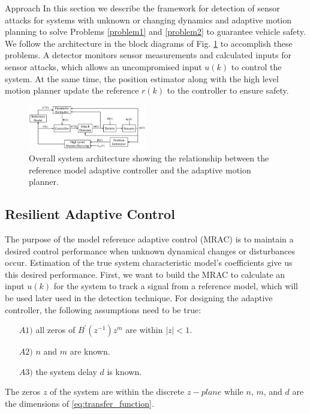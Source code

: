 
\begin{section}{Approach}
\label{sec:approach}
In this section we describe the framework for detection of sensor attacks for systems with unknown or changing dynamics and adaptive motion planning to solve Problems \ref{problem1} and \ref{problem2} to guarantee vehicle safety. We follow the architecture in the block diagrams of Fig. \ref{fig:system_arch} to accomplish these problems. A detector monitors sensor measurements and calculated inputs for sensor attacks, which allows an uncompromised input $u(k)$ to control the system. At the same time, the position estimator along with the high level motion planner update the reference $r(k)$ to the controller to ensure safety.

\begin{figure}[ht!]
\vspace{1pt}
\centering
\includegraphics[width=0.46\textwidth]{sys_arch.png}
\caption{Overall system architecture showing the relationship between the reference model adaptive controller and the adaptive motion planner.}
\label{fig:system_arch}
\end{figure}

\subsection{Resilient Adaptive Control}
\label{sec:Res_adapt_control}
The purpose of the model reference adaptive control (MRAC) is to maintain a desired control performance when unknown dynamical changes or disturbances occur. Estimation of the true system characteristic model's coefficients give us this desired performance. First, we want to build the MRAC to calculate an input $u(k)$ for the system to track a signal from a reference model, which will be used later used in the detection technique. For designing the adaptive controller, the following assumptions need to be true:
	\begin{enumerate}[leftmargin=4\parindent]
	\item[$A1)$] all zeros of $B^{'}(z^{-1})z^m$ are within $|z|<1$. 
	\item[$A2)$] $n$ and $m$ are known. 
	\item[$A3)$] the system delay $d$ is known.
	\end{enumerate}
The zeros $z$ of the system are within the discrete $z-plane$ while $n$, $m$, and $d$ are the dimensions of \eqref{eq:transfer_function}.
	

\end{section}
